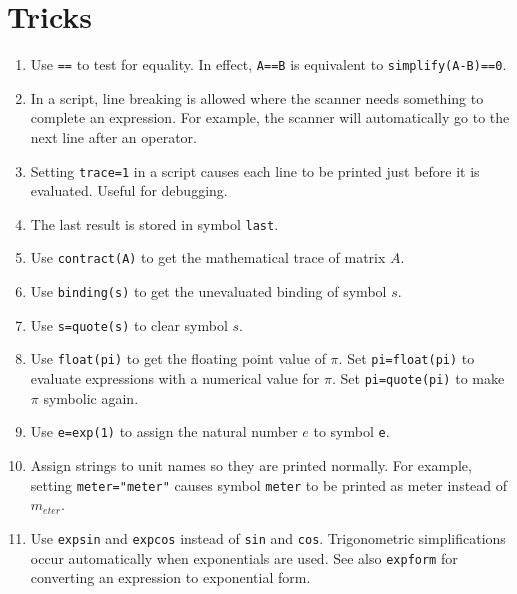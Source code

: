 
\newpage

\section{Tricks}

\begin{enumerate}

\item
Use \verb$==$ to test for equality.
In effect, \verb$A==B$ is equivalent to \verb$simplify(A-B)==0$.

\item
In a script, line breaking is allowed where the scanner needs something to complete an expression.
For example, the scanner will automatically go to the next line after an operator.

\item
Setting \verb$trace=1$ in a script causes each line to be printed just before it is evaluated.
Useful for debugging.

\item
The last result is stored in symbol \verb$last$.

\item
Use \verb$contract(A)$ to get the mathematical trace of matrix $A$.

\item
Use \verb$binding(s)$ to get the unevaluated binding of symbol $s$.

\item
Use \verb$s=quote(s)$ to clear symbol $s$.

\item
Use \verb$float(pi)$ to get the floating point value of $\pi$.
Set \verb$pi=float(pi)$ to evaluate expressions with a numerical value for $\pi$.
Set \verb$pi=quote(pi)$ to make $\pi$ symbolic again.

\item
Use \verb$e=exp(1)$ to assign the natural number $e$ to symbol \verb$e$.

\item
Assign strings to unit names so they are printed normally.
For example, setting \verb$meter="meter"$ causes symbol \verb$meter$
to be printed as meter instead of $m_{eter}$.

\item
Use \verb$expsin$ and \verb$expcos$ instead of \verb$sin$ and \verb$cos$.
Trigonometric simplifications occur automatically when exponentials are used.
See also \verb$expform$ for converting an expression to exponential form.


\end{enumerate}
